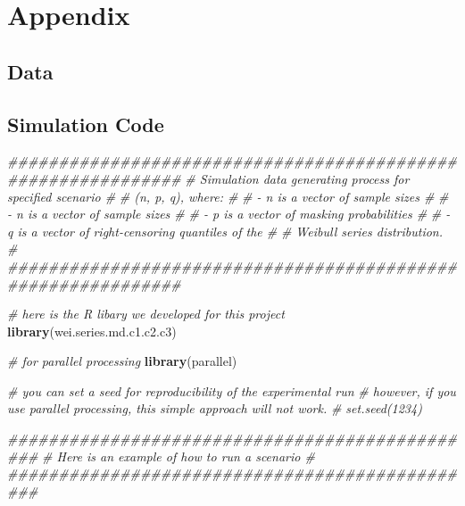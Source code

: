 \documentclass[
]{article}
\newenvironment{Shaded}{\begin{snugshade}}{\end{snugshade}}
\newcommand{\CommentTok}[1]{\textcolor[rgb]{0.56,0.35,0.01}{\textit{#1}}}
\newcommand{\KeywordTok}[1]{\textcolor[rgb]{0.13,0.29,0.53}{\textbf{#1}}}
\newcommand{\NormalTok}[1]{#1}
\begin{document}
\hypertarget{app}{%
\section{Appendix}\label{app}}

\hypertarget{app:data}{%
\subsection{Data}\label{app:data}}

\hypertarget{simulation-code}{%
\subsection*{Simulation Code}\label{simulation-code}}

\begin{Shaded}
\begin{Highlighting}[]
\CommentTok{\#\#\#\#\#\#\#\#\#\#\#\#\#\#\#\#\#\#\#\#\#\#\#\#\#\#\#\#\#\#\#\#\#\#\#\#\#\#\#\#\#\#\#\#\#\#\#\#\#\#\#\#\#\#\#\#\#\#\#\#\#}
\CommentTok{\# Simulation data generating process for specified scenario \#}
\CommentTok{\# (n, p, q), where:                                         \#}
\CommentTok{\#    {-} n is a vector of sample sizes                        \#}
\CommentTok{\#     {-} n is a vector of sample sizes                       \#}
\CommentTok{\#     {-} p is a vector of masking probabilities              \#}
\CommentTok{\#     {-} q is a vector of right{-}censoring quantiles of the   \#}
\CommentTok{\#       Weibull series distribution.                        \#}
\CommentTok{\#\#\#\#\#\#\#\#\#\#\#\#\#\#\#\#\#\#\#\#\#\#\#\#\#\#\#\#\#\#\#\#\#\#\#\#\#\#\#\#\#\#\#\#\#\#\#\#\#\#\#\#\#\#\#\#\#\#\#\#\#}

\CommentTok{\# here is the R libary we developed for this project}
\KeywordTok{library}\NormalTok{(wei.series.md.c1.c2.c3) }

\CommentTok{\# for parallel processing}
\KeywordTok{library}\NormalTok{(parallel)}

\CommentTok{\# you can set a seed for reproducibility of the experimental run}
\CommentTok{\# however, if you use parallel processing, this simple approach will not work.}
\CommentTok{\# set.seed(1234)}

\CommentTok{\#\#\#\#\#\#\#\#\#\#\#\#\#\#\#\#\#\#\#\#\#\#\#\#\#\#\#\#\#\#\#\#\#\#\#\#\#\#\#\#\#\#\#\#\#\#\#}
\CommentTok{\# Here is an example of how to run a scenario \#}
\CommentTok{\#\#\#\#\#\#\#\#\#\#\#\#\#\#\#\#\#\#\#\#\#\#\#\#\#\#\#\#\#\#\#\#\#\#\#\#\#\#\#\#\#\#\#\#\#\#\#}


\end{Highlighting}
\end{Shaded}
\end{document}
